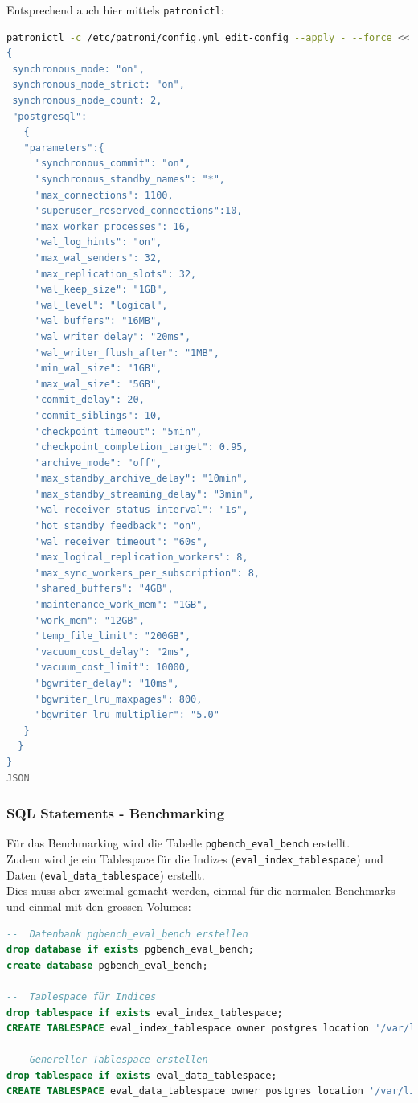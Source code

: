 Entsprechend auch hier mittels \texttt{patronictl}:
\lstset{style=gra_codestyle}
\begin{lstlisting}[language=bash, caption=Patroni - 250GiB set Parameter,captionpos=b,label={lst:patroni_250gib_set_parameter},breaklines=true]
patronictl -c /etc/patroni/config.yml edit-config --apply - --force <<'JSON'
{
 synchronous_mode: "on",
 synchronous_mode_strict: "on",
 synchronous_node_count: 2,
 "postgresql":
   {
   "parameters":{
     "synchronous_commit": "on",
     "synchronous_standby_names": "*",
     "max_connections": 1100,
     "superuser_reserved_connections":10,
     "max_worker_processes": 16,
     "wal_log_hints": "on",
     "max_wal_senders": 32,
     "max_replication_slots": 32,
     "wal_keep_size": "1GB",
     "wal_level": "logical",
     "wal_buffers": "16MB",
     "wal_writer_delay": "20ms",
     "wal_writer_flush_after": "1MB",
     "min_wal_size": "1GB",
     "max_wal_size": "5GB",
     "commit_delay": 20,
     "commit_siblings": 10,
     "checkpoint_timeout": "5min",
     "checkpoint_completion_target": 0.95,
     "archive_mode": "off",
     "max_standby_archive_delay": "10min",
     "max_standby_streaming_delay": "3min",
     "wal_receiver_status_interval": "1s",
     "hot_standby_feedback": "on",
     "wal_receiver_timeout": "60s",
     "max_logical_replication_workers": 8,
     "max_sync_workers_per_subscription": 8,
     "shared_buffers": "4GB",
     "maintenance_work_mem": "1GB",
     "work_mem": "12GB",
     "temp_file_limit": "200GB",
     "vacuum_cost_delay": "2ms",
     "vacuum_cost_limit": 10000,
     "bgwriter_delay": "10ms",
     "bgwriter_lru_maxpages": 800,
     "bgwriter_lru_multiplier": "5.0"
   }
  }
}
JSON
\end{lstlisting}
\subsubsection{SQL Statements - Benchmarking}
\label{subsubsec:patroni_benchmarking_sql}
Für das Benchmarking wird die Tabelle \texttt{pgbench\_eval\_bench} erstellt.\\
Zudem wird je ein Tablespace für die Indizes (\texttt{eval\_index\_tablespace}) und Daten (\texttt{eval\_data\_tablespace}) erstellt.\\
Dies muss aber zweimal gemacht werden, einmal für die normalen Benchmarks und einmal mit den grossen Volumes:
\lstset{style=gra_codestyle}
\begin{lstlisting}[language=sql, caption=Patroni - Benchmarking - DB erstellen,captionpos=b,label={lst:patroni-benchmarking-create-db},breaklines=true]
--  Datenbank pgbench_eval_bench erstellen
drop database if exists pgbench_eval_bench;
create database pgbench_eval_bench;

--  Tablespace für Indices
drop tablespace if exists eval_index_tablespace;
CREATE TABLESPACE eval_index_tablespace owner postgres location '/var/lib/patroni/eval_index_tablespace';

--  Genereller Tablespace erstellen
drop tablespace if exists eval_data_tablespace;
CREATE TABLESPACE eval_data_tablespace owner postgres location '/var/lib/patroni/eval_data_tablespace';
\end{lstlisting}

